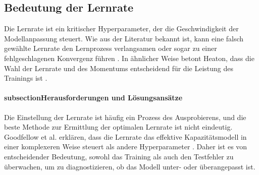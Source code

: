 
\subsection{Bedeutung der Lernrate}
\label{sec: Learnign Rate}

Die Lernrate ist ein kritischer Hyperparameter, der die Geschwindigkeit der Modellanpassung steuert. Wie aus der Literatur bekannt ist, kann eine falsch gewählte Lernrate den Lernprozess verlangsamen oder sogar zu einer fehlgeschlagenen Konvergenz führen \cite{russell2021ai}. In ähnlicher Weise betont Heaton, dass die Wahl der Lernrate und des Momentums entscheidend für die Leistung des Trainings ist \cite{heaton_2012}.

\paragraph{subsectionHerausforderungen und Lösungsansätze}

Die Einstellung der Lernrate ist häufig ein Prozess des Ausprobierens, und die beste Methode zur Ermittlung der optimalen Lernrate ist nicht eindeutig. Goodfellow et al. erklären, dass die Lernrate das effektive Kapazitätsmodell in einer komplexeren Weise steuert als andere Hyperparameter \cite{Goodfellow-et-al-2016}. Daher ist es von entscheidender Bedeutung, sowohl das Training als auch den Testfehler zu überwachen, um zu diagnostizieren, ob das Modell unter- oder überangepasst ist.

